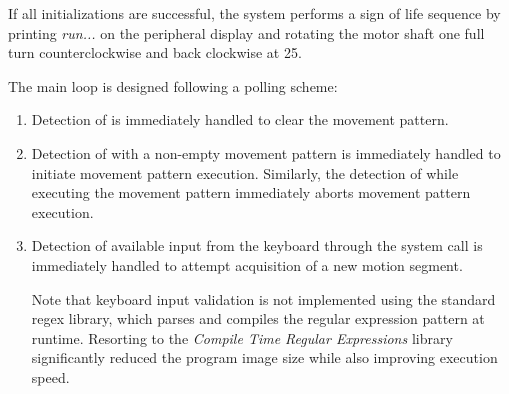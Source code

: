 If all initializations are successful, the system performs a sign of life sequence by printing \textit{run...} on the peripheral display and rotating the motor shaft one full turn counterclockwise and back clockwise at \qty{25}{\rpm}.

The main loop is designed following a polling scheme:
\begin{enumerate}
    \item Detection of  is immediately handled to clear the movement pattern.
    
    \item Detection of  with a non-empty movement pattern is immediately handled to initiate movement pattern execution.
    Similarly, the detection of  while executing the movement pattern immediately aborts movement pattern execution.
    
    \item Detection of available input from the keyboard through the  system call is immediately handled to attempt acquisition of a new motion segment.

    Note that keyboard input validation is not implemented using the \cpp standard regex library, which parses and compiles the regular expression pattern at runtime. Resorting to the \textit{Compile Time Regular Expressions} library significantly reduced the program image size while also improving execution speed.
\end{enumerate}
